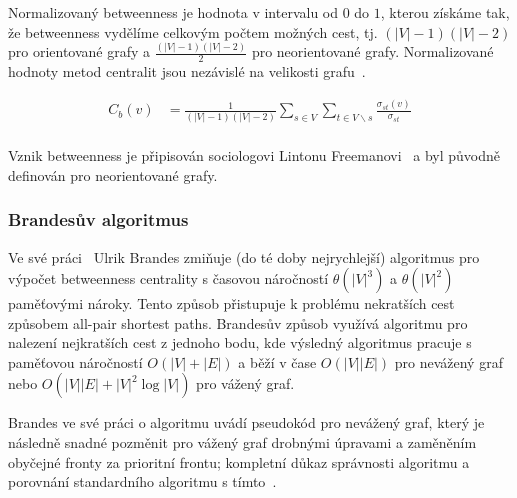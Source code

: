 \documentclass{bakalarka}
\begin{document}
Normalizovaný betweenness je hodnota v intervalu od $0$ do $1$, kterou získáme
tak, že betweenness vydělíme celkovým počtem možných cest, tj. $(|V| - 1)(|V| -
2)$ pro orientované grafy a $\frac{(|V| - 1)(|V| - 2)}{2}$ pro neorientované
grafy. Normalizované hodnoty metod centralit jsou nezávislé na velikosti
grafu~\citep{whiteborgatti1994}.

\begin{align*}
C_b(v) &= \frac{1}{(|V| - 1)(|V| - 2)} \displaystyle\sum\limits_{s \in V} \displaystyle\sum\limits_{t \in V \backslash s} \frac{\sigma_{st}(v)}{\sigma_{st}} \\
\end{align*}

Vznik betweenness je připisován sociologovi Lintonu
Freemanovi~\citep{freeman1977} a byl původně definován pro neorientované grafy.

\subsubsection{Brandesův algoritmus}
Ve své práci~\citep{brandes2001} Ulrik Brandes zmiňuje (do té doby
nejrychlejší) algoritmus pro výpočet betweenness centrality s časovou
náročností $\theta(|V|^3)$ a $\theta(|V|^2)$ paměťovými nároky. Tento způsob
přistupuje k problému nekratších cest způsobem all-pair shortest paths.
Brandesův způsob využívá algoritmu pro nalezení nejkratších cest z jednoho
bodu, kde výsledný algoritmus pracuje s paměťovou náročností $O(|V| + |E|)$ a
běží v čase $O(|V||E|)$ pro nevážený graf nebo $O(|V||E| + |V|^2 \log|V|)$ pro
vážený graf. 


Brandes ve své práci o algoritmu uvádí pseudokód pro nevážený graf, který je
následně snadné pozměnit pro vážený graf drobnými úpravami a zaměněním obyčejné
fronty za prioritní frontu; kompletní důkaz správnosti algoritmu a porovnání
standardního algoritmu s tímto~\citep{brandes2001}.
\end{document}
